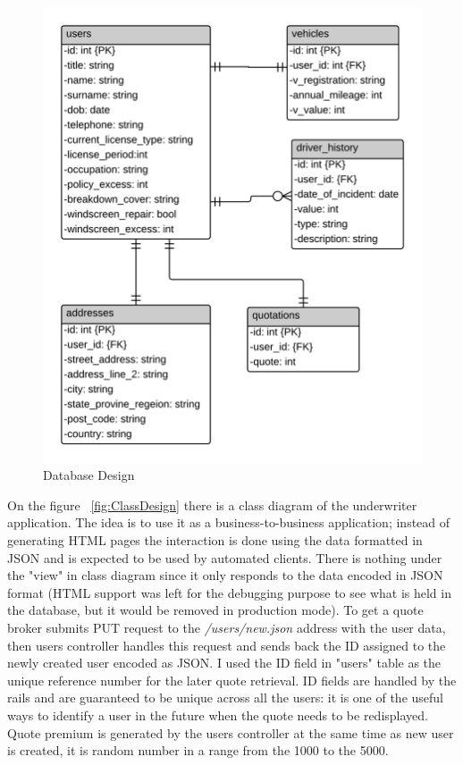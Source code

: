 \documentclass[10pt,a4paper,headinclude=true,twoside]{report}
\begin{document}
\begin{figure}[H]
\centering
\centerline{\includegraphics[scale=0.198]{./DatabaseDesign}}
\caption{Database Design}
\label{fig:DatabaseDesign}
\end{figure}

On the figure ~\ref{fig:ClassDesign} there is a class diagram of the underwriter application. The idea is to use it as a business-to-business application; instead of generating HTML pages the interaction is done using the data formatted in JSON and is expected to be used by automated clients. There is nothing under the "view" in class diagram since it only responds to the data encoded in JSON format (HTML support was left for the debugging purpose to see what is held in the database, but it would be removed in production mode). To get a quote broker submits PUT request to the \textit{/users/new.json} address with the user data, then users controller handles this request and sends back the ID assigned to the newly created user encoded as JSON. I used the ID field in "users" table as the unique reference number for the later quote retrieval. ID fields are handled by the rails and are guaranteed to be unique across all the users: it is one of the useful ways to identify a user in the future when the quote needs to be redisplayed. Quote premium is generated by the users controller at the same time as new user is created, it is random number in a range from the 1000 to the 5000.
\end{document}

